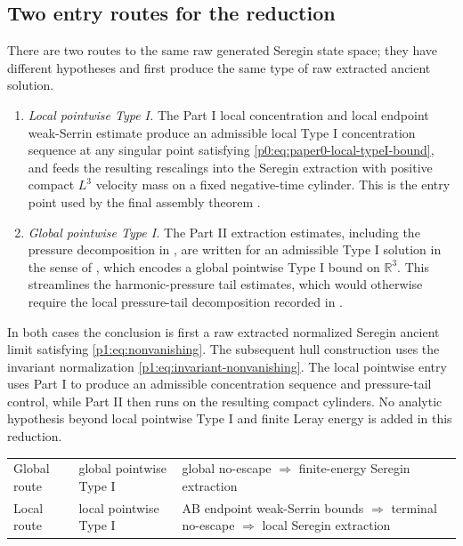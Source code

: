 \documentclass[11pt]{amsart}
\theoremstyle{plain}
\theoremstyle{definition}
\theoremstyle{remark}
\numberwithin{equation}{section}
\newcommand{\R}{\mathbb R}
\begin{document}
\subsection{Two entry routes for the reduction}
\label{p1:sec:two-entry-points}

There are two routes to the same raw generated Seregin state space; they have
different hypotheses and first produce the same type of raw extracted ancient
solution.
\begin{enumerate}[label=\textup{(\arabic*)}]
\item \emph{Local pointwise Type I.}  The Part I local concentration and
local endpoint weak-Serrin estimate 
produce an admissible local Type I concentration sequence at any singular point
satisfying \eqref{p0:eq:paper0-local-typeI-bound}, and
 feeds the resulting
rescalings into the Seregin extraction with positive compact \(L^3\)
velocity mass on a fixed negative-time cylinder.  This is the entry point
used by the final assembly theorem .
\item \emph{Global pointwise Type I.}  The Part II extraction estimates,
including the pressure decomposition in , are written
for an admissible Type I solution in the sense of
, which encodes a global pointwise Type I
bound on \(\R^3\).  This streamlines the harmonic-pressure tail estimates,
which would otherwise require the local pressure-tail decomposition recorded
in .
\end{enumerate}
In both cases the conclusion is first a raw extracted normalized Seregin
ancient limit satisfying \eqref{p1:eq:nonvanishing}.  The subsequent hull
construction uses the
invariant normalization \eqref{p1:eq:invariant-nonvanishing}.  The local
pointwise entry uses Part I to produce
an admissible concentration sequence and pressure-tail control, while Part II
then runs on the resulting compact cylinders.  No analytic hypothesis beyond
local pointwise Type I and finite Leray energy is added in this reduction.

\begin{center}
\begin{tabular}{p{}p{}p{}}
Global route & global pointwise Type I &
global no-escape \(\Rightarrow\) finite-energy Seregin extraction \\
Local route & local pointwise Type I &
AB endpoint weak-Serrin bounds \(\Rightarrow\) terminal no-escape
\(\Rightarrow\) local Seregin extraction
\end{tabular}
\end{center}
\end{document}
